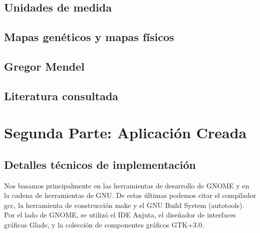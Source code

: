 \documentclass{article}
\begin{document}
	\subsection{Unidades de medida}
	
	
	
	\subsection{Mapas genéticos y mapas físicos}
	
	
	
	\subsection{Gregor Mendel}
	
	
	
	\subsection{Literatura consultada}
	
	
	
	\section{Segunda Parte: Aplicación Creada}
	
	\subsection{Detalles técnicos de implementación}
	
	Nos basamos principalmente en las herramientas de desarrollo de GNOME y en la cadena de herramientas de GNU. De estas últimas podemos citar el compilador gcc, la herramienta de construcción make y el GNU Build System (autotools). Por el lado de GNOME, se utilizó el IDE Anjuta, el diseñador de interfaces gráficas Glade, y la colección de componentes gráficos GTK+3.0.
	
\end{document}
